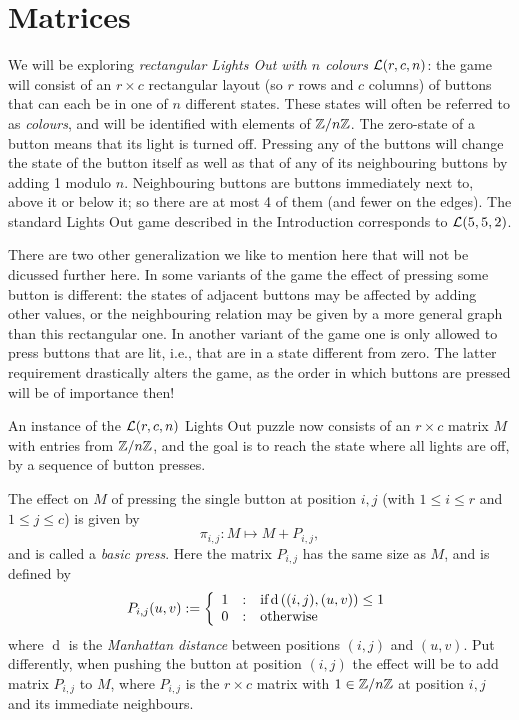 \section{Matrices}\label{sec:def}
We will be exploring {\it rectangular Lights Out with
$n$ colours} $\mathcal{L}(r, c, n)$: the game will consist of an $r\times c$ rectangular
layout (so $r$ rows and $c$ columns) of buttons that can each be
in one of $n$ different states. These states will often be referred to
as {\it colours}, and will be identified with elements
of $\mathbb{Z}/n\mathbb{Z}$. 
The zero-state of a button means that its light is turned off.
Pressing any of the buttons will change the state
of the button itself as well as that of any of its neighbouring buttons
by adding 1 modulo $n$. 
Neighbouring buttons are buttons
immediately next to, above it or below it; so there are at most 4
of them (and fewer on the edges).
The standard Lights Out game described in the Introduction
corresponds to $\mathcal{L}(5,5,2)$.

\begin{remark}
There are two other generalization we like to mention here that will not be
dicussed further here. In some variants of the game the effect of pressing some
button is different: the states of adjacent buttons may be affected by adding
other values, or the neighbouring relation may be given by a more general
graph than this rectangular one. In another variant of the game one is
only allowed to press buttons that are lit, i.e., that are in a state
different from zero. The latter requirement drastically alters the
game, as the order in which buttons are pressed will be of importance then!
\end{remark}
%
An instance of the $\mathcal{L}(r, c, n)$ Lights Out puzzle now consists
of an $r\times c$ matrix $M$ with entries from $\mathbb{Z}/n\mathbb{Z}$, and the goal
is to reach the state where all lights are off, by a sequence of button
presses.

The effect on $M$ of pressing the single button at position $i, j$
(with $1\leq i \leq r$ and $1\leq j \leq c$) is given by
$$\pi_{i,j}: M\mapsto M+P_{i, j},$$
and is called a {\it basic press}.
Here the matrix $P_{i,j}$ has the same size as $M$, and is
defined by
\[
    P_{i,j}{(u,v)} :=
    \left\{
    \begin{array}{l@{\quad:\quad}l}
        1 & \text{if} \operatorname{d}\left((i,j), (u,v)\right) \leq 1 \\
        0 & \text{otherwise}
    \end{array}
    \right.
\]
where $\operatorname{d}$ is the \emph{Manhattan distance} between 
positions $(i,j)$ and $(u,v)$.
Put differently, when pushing the button at position $(i, j)$ the effect will
be to add matrix $P_{i,j}$ to $M$, where $P_{i,j}$ is the $r\times c$ matrix
with $1\in\mathbb{Z}/n\mathbb{Z}$ at position $i, j$ and its immediate neighbours.

